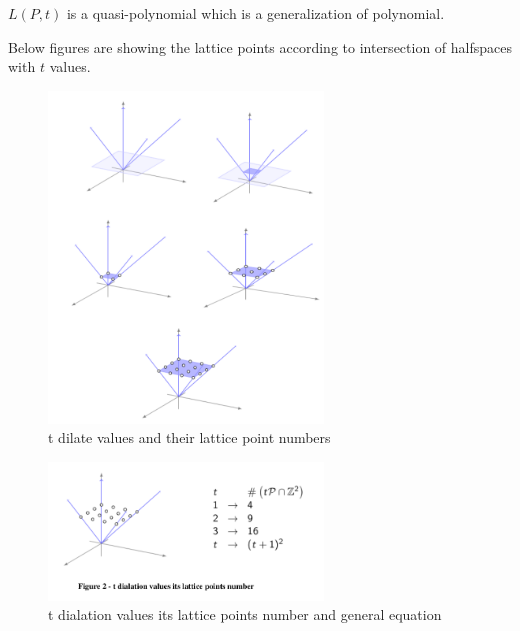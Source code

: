 \documentclass[12pt,twoside]{article}
\begin{document}
$L(P,t)$ is a quasi-polynomial which is a generalization of polynomial.\newline
\par
Below figures are showing the lattice points according to intersection of
halfspaces with $t$ values.
\newline
\begin{figure}[!h]
  \centering
          \includegraphics[width=0.65\textwidth]{tandlattice.png}
  \caption{t dilate values and their lattice point numbers}
\end{figure}


\newpage
\begin{figure}[t]
  \centering
          \includegraphics[width=0.65\textwidth]{tdialatevaleq.png}
  \caption{t dialation values its lattice points number and general equation}
\end{figure}
\end{document}
